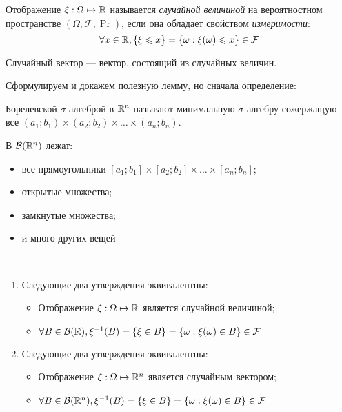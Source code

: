 \begin{definition}
    Отображение $\xi: \Omega \mapsto \mathbb{R}$ называется \emph{случайной величиной} на вероятностном пространстве
    $(\Omega, \mathcal{F}, \Pr)$, если она обладает свойством \emph{измеримости}:
    \[
        \forall x \in \mathbb{R}, \left\{ \xi \leqslant x \right\} = \left\{ \omega: \xi(\omega) \leqslant x \right\}
        \in \mathcal{F}
    \]
\end{definition}

\begin{definition}
    Случайный вектор --- вектор, состоящий из случайных величин.
\end{definition}

Сформулируем и докажем полезную лемму, но сначала определение:

\begin{definition}
    Борелевской $\sigma$-алгеброй в $\mathbb{R}^n$ называют минимальную $\sigma$-алгебру сожержащую все $(a_1; b_1)
    \times (a_2; b_2) \times \ldots \times (a_n; b_n)$.
\end{definition}

В $\mathcal{B}(\mathbb{R}^n)$ лежат:

\begin{itemize}
    \item все прямоугольники $[a_1; b_1] \times [a_2; b_2] \times \ldots \times [a_n; b_n]$;
    \item открытые множества;
    \item замкнутые множества;
    \item и много других вещей
\end{itemize}

\begin{lemma}
    \ \\
    \begin{enumerate}
        \item
            Следующие два утверждения эквивалентны:
            \begin{itemize}
                \item Отображение $\xi: \Omega \mapsto \mathbb{R}$ является случайной величиной;
                \item $\forall B \in \mathcal{B}(\mathbb{R}), \xi^{-1}(B) = \left\{ \xi \in B \right\} = \left\{ \omega:
                        \xi(\omega) \in B \right\} \in \mathcal{F}$
            \end{itemize}
        \item
            Следующие два утверждения эквивалентны:
            \begin{itemize}
                \item Отображение $\xi: \Omega \mapsto \mathbb{R}^n$ является случайным вектором;
                \item $\forall B \in \mathcal{B}(\mathbb{R}^n), \xi^{-1}(B) = \left\{ \xi \in B \right\} = \left\{ \omega:
                        \xi(\omega) \in B \right\} \in \mathcal{F}$
            \end{itemize}
    \end{enumerate}
\end{lemma}

